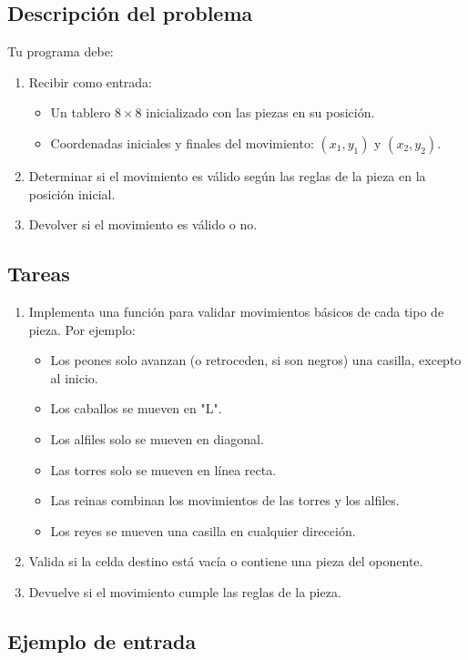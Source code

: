 \subsection*{Descripción del problema}

Tu programa debe:
\begin{enumerate}
    \item Recibir como entrada:
    \begin{itemize}
        \item Un tablero \(8 \times 8\) inicializado con las piezas en su posición.
        \item Coordenadas iniciales y finales del movimiento: \((x_1, y_1)\) y \((x_2, y_2)\).
    \end{itemize}
    \item Determinar si el movimiento es válido según las reglas de la pieza en la posición inicial.
    \item Devolver si el movimiento es válido o no.
\end{enumerate}

\subsection*{Tareas}
\begin{enumerate}
    \item Implementa una función para validar movimientos básicos de cada tipo de pieza. Por ejemplo:
    \begin{itemize}
        \item Los peones solo avanzan (o retroceden, si son negros) una casilla, excepto al inicio.
        \item Los caballos se mueven en "L".
        \item Los alfiles solo se mueven en diagonal.
        \item Las torres solo se mueven en línea recta.
        \item Las reinas combinan los movimientos de las torres y los alfiles.
        \item Los reyes se mueven una casilla en cualquier dirección.
    \end{itemize}
    \item Valida si la celda destino está vacía o contiene una pieza del oponente.
    \item Devuelve si el movimiento cumple las reglas de la pieza.
\end{enumerate}

\subsection*{Ejemplo de entrada}

